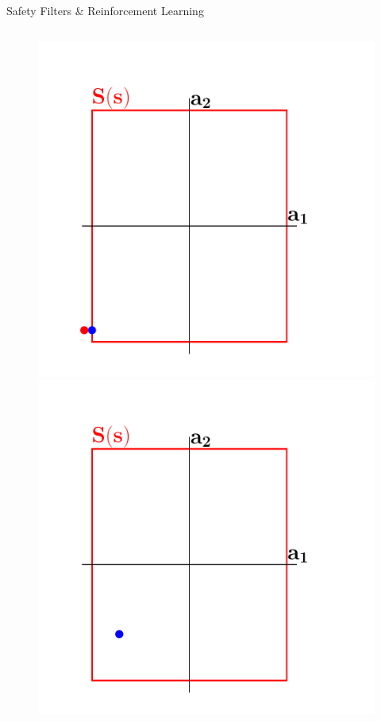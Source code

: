 \documentclass[lecture]{beamer}
\begin{document}
\begin{frame}{\normalsize Safety Filters \& Reinforcement Learning}
\begin{columns}[t]
\begin{overlayarea}{\textwidth}{.5\textheight}
\begin{figure}
{	\includegraphics[width=1\textwidth,clip]{Codes/SafetyFilters/Projection1.pdf}
	}
	      \only<5>
        {
        \center
	\includegraphics[width=1\textwidth,clip]{Codes/SafetyFilters/Projection2.pdf}
}
\end{figure}
\end{overlayarea}
\end{columns}
\end{frame}
\end{document}
